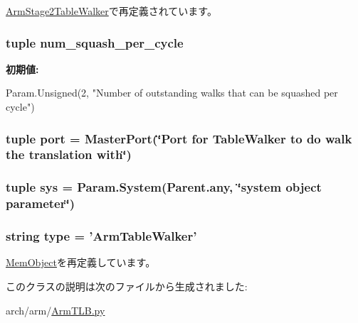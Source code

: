 \hyperlink{classArmTLB_1_1ArmStage2TableWalker_ae8e57fdf256a1e5df80b0c5ab8a52336}{ArmStage2TableWalker}で再定義されています。\hypertarget{classArmTLB_1_1ArmTableWalker_a6fedb4107249699f51b624cf7677475c}{
\subsubsection[{num\_\-squash\_\-per\_\-cycle}]{\setlength{\rightskip}{0pt plus 5cm}tuple {\bf num\_\-squash\_\-per\_\-cycle}}}
\label{classArmTLB_1_1ArmTableWalker_a6fedb4107249699f51b624cf7677475c}
{\bfseries 初期値:}
\begin{DoxyCode}
Param.Unsigned(2,
            "Number of outstanding walks that can be squashed per cycle")
\end{DoxyCode}
\hypertarget{classArmTLB_1_1ArmTableWalker_a1aadf525515ecfcf662c2aa51a503763}{
\subsubsection[{port}]{\setlength{\rightskip}{0pt plus 5cm}tuple {\bf port} = {\bf MasterPort}(\char`\"{}Port for TableWalker to do walk the translation with\char`\"{})}}
\label{classArmTLB_1_1ArmTableWalker_a1aadf525515ecfcf662c2aa51a503763}
\hypertarget{classArmTLB_1_1ArmTableWalker_a1f27497e90bf86cc0b513e5c086c9e19}{
\subsubsection[{sys}]{\setlength{\rightskip}{0pt plus 5cm}tuple {\bf sys} = Param.System(Parent.any, \char`\"{}system object parameter\char`\"{})}}
\label{classArmTLB_1_1ArmTableWalker_a1f27497e90bf86cc0b513e5c086c9e19}
\hypertarget{classArmTLB_1_1ArmTableWalker_acce15679d830831b0bbe8ebc2a60b2ca}{
\subsubsection[{type}]{\setlength{\rightskip}{0pt plus 5cm}string {\bf type} = '{\bf ArmTableWalker}'}}
\label{classArmTLB_1_1ArmTableWalker_acce15679d830831b0bbe8ebc2a60b2ca}


\hyperlink{classMemObject_1_1MemObject_acce15679d830831b0bbe8ebc2a60b2ca}{MemObject}を再定義しています。

このクラスの説明は次のファイルから生成されました:\begin{DoxyCompactItemize}
\item 
arch/arm/\hyperlink{ArmTLB_8py}{ArmTLB.py}\end{DoxyCompactItemize}
